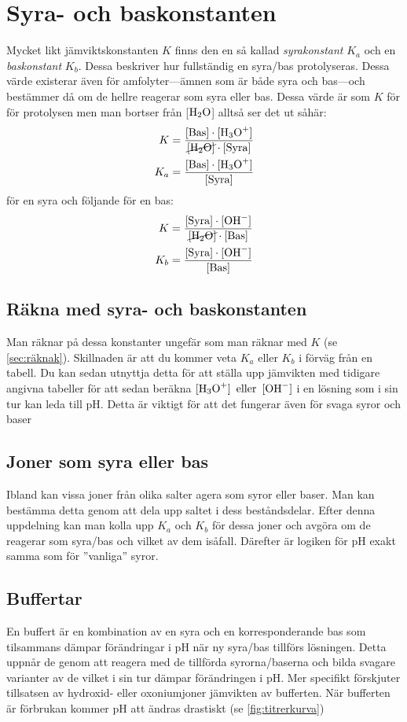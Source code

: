 \section{Syra- och baskonstanten}
Mycket likt jämviktskonstanten $K$ finns den en så kallad \emph{syrakonstant} $K_a$ och en \emph{baskonstant} $K_b$. Dessa beskriver hur fullständig en syra/bas protolyseras. Dessa värde existerar även för amfolyter---ämnen som är både syra och bas---och bestämmer då om de hellre reagerar som syra eller bas. Dessa värde är som $K$ för för protolysen men man bortser från [$\ce{H2O}$] alltså ser det ut såhär:
\begin{align*}
    K &= \frac{\mathrm{[Bas]} \cdot [\ce{H3O+}]}{\cancel{\ce{[H2O]}} \cdot \mathrm{[Syra]}} \\
    K_a &= \frac{\mathrm{[Bas]} \cdot [\ce{H3O+}]}{\mathrm{[Syra]}} 
\end{align*}
för en syra och följande för en bas:\begin{align*}
    K &= \frac{\mathrm{[Syra]} \cdot [\ce{OH^-}]}{\cancel{\ce{[H2O]}} \cdot \mathrm{[Bas]}} \\
    K_b&= \frac{\mathrm{[Syra]} \cdot [\ce{OH^-}]}{\mathrm{[Bas]}} 
\end{align*}

\subsection{Räkna med syra- och baskonstanten}
Man räknar på dessa konstanter ungefär som man räknar med $K$ (se \vref{sec:räknak}). Skillnaden är att du kommer veta $K_a \text{ eller } K_b$ i förväg från en tabell. Du kan sedan utnyttja detta för att ställa upp jämvikten med tidigare angivna tabeller för att sedan beräkna $\ce{[H3O+] \text{ eller } [OH^-]}$ i en lösning som i sin tur kan leda till pH. Detta är viktigt för att det fungerar även för svaga syror och baser

\subsection{Joner som syra eller bas}
Ibland kan vissa joner från olika salter agera som syror eller baser. Man kan bestämma detta genom att dela upp saltet i dess beståndsdelar. Efter denna uppdelning kan man kolla upp $K_a$ och $K_b$ för dessa joner och avgöra om de reagerar som syra/bas och vilket av dem isåfall. Därefter är logiken för pH exakt samma som för ''vanliga'' syror.

\subsection{Buffertar}
\label{sec:buffertar}
En buffert är en kombination av en syra och en korresponderande bas som tilsammans dämpar förändringar i pH när ny syra/bas tillförs lösningen. Detta uppnår de genom att reagera med de tillförda syrorna/baserna och bilda svagare varianter av de vilket i sin tur dämpar förändringen i pH. Mer specifikt förskjuter tillsatsen av hydroxid- eller oxoniumjoner jämvikten av bufferten. När bufferten är förbrukan kommer pH att ändras drastiskt (se \vref{fig:titrerkurva}) 

